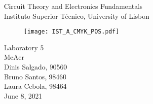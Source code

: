 
\thispagestyle {empty}






\begin{center}


\vspace{1.0cm}

\vspace{1cm}
{\FontLb Circuit Theory and Electronics Fundamentals} \\ %
\vspace{1cm}
{\FontSn Instituto Superior Técnico, University of Lisbon} \\ %
\vspace{1cm}

\begin{figure}[h] \centering
\texttt{[image: IST\_A\_CMYK\_POS.pdf]} 
\end{figure}

{\FontSn Laboratory 5} \\
\vspace{1cm}
{\FontSn MeAer} \\
\vspace{1cm}
{\FontSn Dinis Salgado, 90560} \\
\vspace{0.5cm}
{\FontSn Bruno Santos, 98460} \\
\vspace{0.5cm}
{\FontSn Laura Cebola, 98464} \\
\vspace{1cm}
{\FontSn June 8, 2021} \\ %
\vspace{1cm}
%
\end{center}